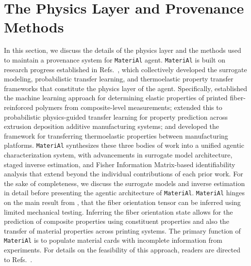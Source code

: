 \documentclass[preprint,review,10pt,number]{elsarticle}
\begin{document}
\section{The Physics Layer and Provenance Methods}
In this section, we discuss the details of the physics layer and the methods used to maintain a provenance system for \texttt{MateriAl} agent.
\texttt{MateriAl} is built on research progress established in  Refs.~\cite{thomas2022machine, thomas2024probabilistic, ghosh2025framework}, which collectively developed the surrogate modeling, probabilistic transfer learning, and thermoelastic property transfer frameworks that constitute the physics layer of the agent.
Specifically, \citet{thomas2022machine} established the machine learning approach for determining elastic properties of printed fiber-reinforced polymers from composite-level measurements; \citet{thomas2024probabilistic} extended this to probabilistic physics-guided transfer learning for property prediction across extrusion deposition additive manufacturing systems; and \citet{ghosh2025framework}  developed the framework for transferring thermoelastic properties between manufacturing platforms.
\texttt{MateriAl} synthesizes these three bodies of work into a unified agentic characterization system, with advancements in surrogate model architecture, staged inverse estimation, and Fisher Information Matrix-based identifiability analysis that extend beyond the individual contributions of each prior work.
For the sake of completeness, we discuss the surrogate models and inverse estimation in detail before presenting the agentic architecture of  \texttt{MateriAl}.
\texttt{MateriAl} hinges on the main result from \cite{thomas2022machine}, that the fiber orientation tensor can be inferred using limited mechanical testing. 
Inferring the fiber orientation state allows for the prediction of composite properties using constituent properties and also the transfer of material properties across printing systems.
The primary function of \texttt{MateriAl} is to populate material cards with incomplete information from experiments.
For details on the feasibility of this approach, readers are directed to Refs.~\cite{thomas2022machine, thomas2024probabilistic, ghosh2025framework}.
\end{document}
